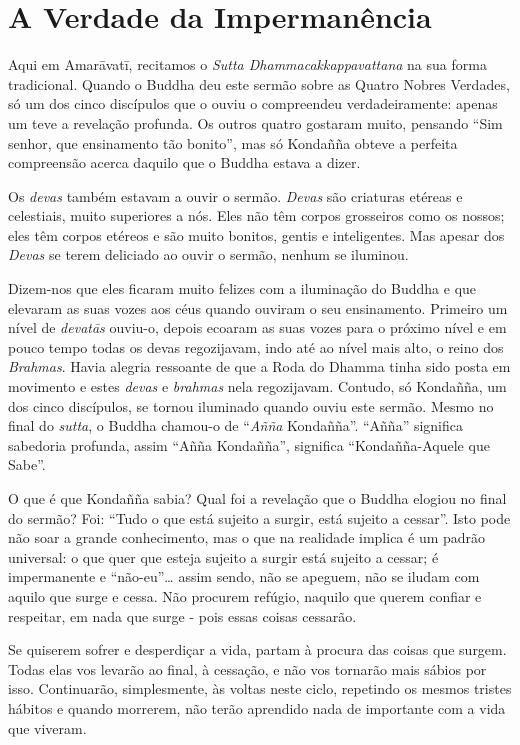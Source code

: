 \section{A Verdade da Impermanência}

Aqui em Amarāvatī, recitamos o \emph{Sutta Dhammacakkappavattana} na sua forma
tradicional. Quando o Buddha deu este sermão sobre as Quatro Nobres Verdades, só
um dos cinco discípulos que o ouviu o compreendeu verdadeiramente: apenas um
teve a revelação profunda. Os outros quatro gostaram muito, pensando “Sim
senhor, que ensinamento tão bonito”, mas só Kondañña obteve a perfeita
compreensão acerca daquilo que o Buddha estava a dizer.

Os \emph{devas} também estavam a ouvir o sermão. \emph{Devas} são criaturas
etéreas e celestiais, muito superiores a nós. Eles não têm corpos grosseiros
como os nossos; eles têm corpos etéreos e são muito bonitos, gentis e
inteligentes. Mas apesar dos \emph{Devas} se terem deliciado ao ouvir o sermão,
nenhum se iluminou.

Dizem-nos que eles ficaram muito felizes com a iluminação do Buddha e que
elevaram as suas vozes aos céus quando ouviram o seu ensinamento. Primeiro um nível de \emph{devatās} ouviu-o, depois ecoaram as suas vozes para o próximo nível e em pouco tempo todas os devas regozijavam, indo até ao nível mais alto, o reino dos
\emph{Brahmas}. Havia alegria ressoante de que a Roda do Dhamma tinha sido posta
em movimento e estes \emph{devas} e \emph{brahmas} nela regozijavam. Contudo, só
Kondañña, um dos cinco discípulos, se tornou iluminado quando ouviu este sermão.
Mesmo no final do \emph{sutta}, o Buddha chamou-o de “\emph{Añña} Kondañña”.
“Añña” significa sabedoria profunda, assim “Añña Kondañña”, significa
“Kondañña-Aquele que Sabe”.

O que é que Kondañña sabia? Qual foi a revelação que o Buddha elogiou no final
do sermão? Foi: “Tudo o que está sujeito a surgir, está sujeito a cessar”. Isto
pode não soar a grande conhecimento, mas o que na realidade implica é um padrão
universal: o que quer que esteja sujeito a surgir está sujeito a cessar; é
impermanente e “não-eu”\ldots{} assim sendo, não se apeguem, não se iludam com
aquilo que surge e cessa. Não procurem refúgio, naquilo que querem confiar e
respeitar, em nada que surge - pois essas coisas cessarão.

Se quiserem sofrer e desperdiçar a vida, partam à procura das coisas que surgem.
Todas elas vos levarão ao final, à cessação, e não vos tornarão mais sábios por
isso. Continuarão, simplesmente, às voltas neste ciclo, repetindo os mesmos
tristes hábitos e quando morrerem, não terão aprendido nada de importante com a
vida que viveram.

